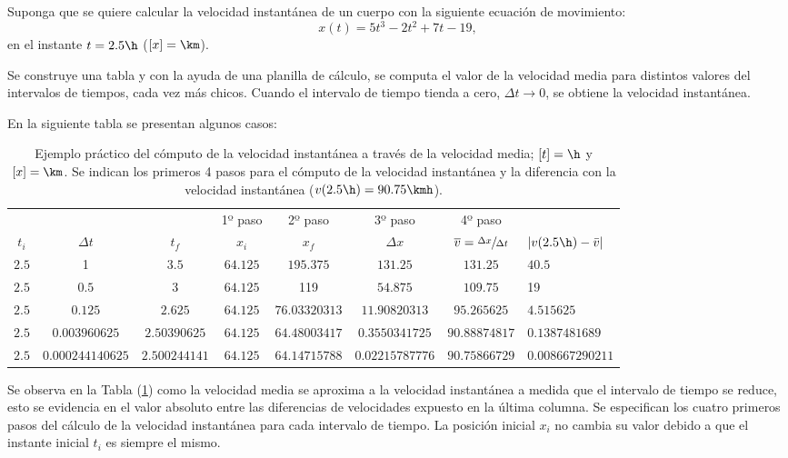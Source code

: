 Suponga que se quiere calcular la velocidad instantánea de un cuerpo con la
siguiente ecuación de movimiento:
\[
x(t) = 5t^3 - 2t^2 +7t-19,
\]
en el instante $t=2.5\h$ ($[x]=\km$).

Se construye una tabla y con la ayuda de una planilla de cálculo, se computa el
valor de la velocidad media para distintos valores del intervalos de tiempos,
cada vez más chicos. Cuando el intervalo de tiempo tienda a cero, $\Delta t\to
0$, se obtiene la velocidad instantánea.

En la siguiente tabla se presentan algunos casos:
\begin{table}[!h]
\centering
\footnotesize
\hspace*{-0.7cm}
\begin{tabular}{ccc|cccc|l}
\hline\hline
 &&& 1º paso & 2º paso & 3º paso & 4º paso \\
$t_i$ & $\Delta t$ & $t_f$ & $x_i$ & $x_f$ & $\Delta x$ & 
$\overline{v}=\sfrac{\Delta x}{\Delta t}$ & 
$\left|v(2.5\h) - \bar{v}\right|$ \\
\hline
$2.5$ & 1 & $3.5$ & $64.125$ & $195.375$ & $131.25$ & $131.25$ & $40.5$ \\
$2.5$ & $0.5$ & 3 & $64.125$ & 119 & $54.875$ & $109.75$ & 19 \\
$2.5$ & $0.125$ & $2.625$ & $64.125$ & $76.03320313$ & $11.90820313$ &
$95.265625$ & $4.515625$ \\
$2.5$ & $0.003960625$ & $2.50390625$ & $64.125$ & $64.48003417$ & 
$0.3550341725$ & $90.88874817$ & $0.1387481689$ \\
$2.5$ & $0.000244140625$ & $2.500244141$ & $64.125$ & $64.14715788$ & 
$0.02215787776$ & $90.75866729$ & $0.008667290211$ \\
\hline
\end{tabular}
\normalsize
\caption{Ejemplo práctico del cómputo de la velocidad instantánea a través de la
velocidad media; $[t]=\h$ y $[x]=\km$. Se indican los primeros 4 pasos para el
cómputo de la velocidad instantánea y la diferencia con la velocidad
instantánea ($v(2.5\h)=90.75\kmh$).}
\label{t.velinst}
\end{table}

Se observa en la Tabla (\ref{t.velinst}) como la velocidad media se aproxima a
la velocidad instantánea a medida que el intervalo de tiempo se reduce, esto se
evidencia en el valor absoluto entre las diferencias de velocidades expuesto en
la última columna. Se especifican los cuatro primeros pasos del cálculo de la
velocidad instantánea para cada intervalo de tiempo. La posición inicial $x_i$
no cambia su valor debido a que el instante inicial $t_i$ es siempre el mismo.

